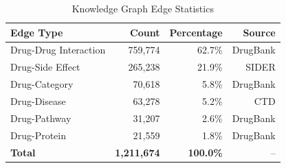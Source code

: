 \begin{table}[htbp]
\centering
\caption{Knowledge Graph Edge Statistics}
\label{tab:kg_edges}
\begin{tabular}{lrrr}
\toprule
\textbf{Edge Type} & \textbf{Count} & \textbf{Percentage} & \textbf{Source} \\
\midrule
Drug-Drug Interaction & 759,774 & 62.7\% & DrugBank \\
Drug-Side Effect & 265,238 & 21.9\% & SIDER \\
Drug-Category & 70,618 & 5.8\% & DrugBank \\
Drug-Disease & 63,278 & 5.2\% & CTD \\
Drug-Pathway & 31,207 & 2.6\% & DrugBank \\
Drug-Protein & 21,559 & 1.8\% & DrugBank \\
\midrule
\textbf{Total} & \textbf{1,211,674} & \textbf{100.0\%} & -- \\
\bottomrule
\end{tabular}
\end{table}
